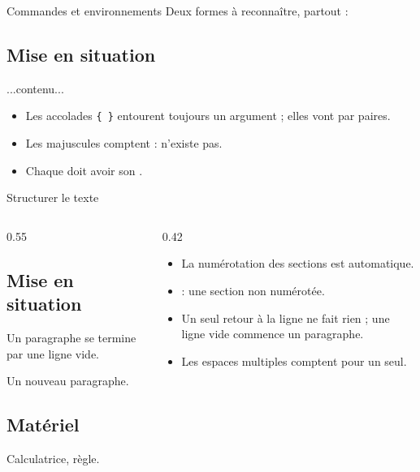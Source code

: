 \begin{frame}[fragile]{Commandes et environnements}
  \small Deux formes à reconnaître, partout :
\begin{CodeTeX}[title={Une commande, avec option et argument}]
\section{Mise en situation}       \usepackage[french]{babel}
\end{CodeTeX}
\begin{CodeTeX}[title={Un environnement : un début et une fin qui se répondent}]
\begin{nom}
   ...contenu...
\end{nom}
\end{CodeTeX}
  \begin{itemize}
    \item Les accolades \texttt{\{ \}} entourent toujours un argument ; elles
      vont par paires.
    \item Les majuscules comptent :  n'existe pas.
    \item Chaque  doit avoir son .
  \end{itemize}
\end{frame}

\begin{frame}[fragile]{Structurer le texte}
  \begin{columns}[T]
    \begin{column}{0.55\textwidth}
\begin{CodeTeX}[title={Sections et paragraphes}]
\section{Mise en situation}
Un paragraphe se termine par
une ligne vide.

Un nouveau paragraphe.

\subsection{Matériel}
Calculatrice, règle.
\end{CodeTeX}
    \end{column}
    \begin{column}{0.42\textwidth}
      \small
      \begin{itemize}
        \item La numérotation des sections est automatique.
        \item {} : une section non numérotée.
        \item Un seul retour à la ligne ne fait rien ; une ligne vide
          commence un paragraphe.
        \item Les espaces multiples comptent pour un seul.
      \end{itemize}
    \end{column}
  \end{columns}
\end{frame}

